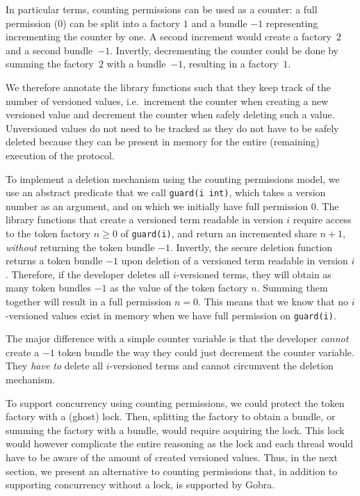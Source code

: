 In particular terms, counting permissions can be used as a counter: a full permission (0) can be split into a factory $1$ and a bundle $-1$ representing incrementing the counter by one.
A second increment would create a factory~$2$ and a second bundle~$-1$. Invertly, decrementing the counter could be done by summing the factory~$2$ with a bundle~$-1$, resulting in a factory~$1$.

We therefore annotate the library functions such that they keep track of the number of versioned values, i.e.\ increment the counter when creating a new versioned value and decrement the counter when safely deleting such a value.
Unversioned values do not need to be tracked as they do not have to be safely deleted because they can be present in memory for the entire (remaining) execution of the protocol.

To implement a deletion mechanism using the counting permissions model, we use an abstract predicate that we call \texttt{guard(i int)}, which takes a version number as an argument, and on which we initially have full permission $0$. The library functions that create a versioned term readable in version $i$ require access to the token factory $n\geq0$ of \texttt{guard(i)}, and return an incremented share $n+1$, \emph{without} returning the token bundle $-1$. Invertly, the secure deletion function returns a token bundle $-1$ upon deletion of a versioned term readable in version $i$. Therefore, if the developer deletes all $i$-versioned terms, they will obtain as many token bundles $-1$ as the value of the token factory $n$. Summing them together will result in a full permission $n = 0$. This means that we know that no $i$-versioned values exist in memory when we have full permission on \texttt{guard(i)}.

The major difference with a simple counter variable is that the developer \emph{cannot} create a $-1$ token bundle the way they could just decrement the counter variable. They \emph{have to} delete all $i$-versioned terms and cannot circumvent the deletion mechanism.

To support concurrency using counting permissions, we could protect the token factory with a (ghost) lock.
Then, splitting the factory to obtain a bundle, or summing the factory with a bundle, would require acquiring the lock.
This lock would however complicate the entire reasoning as the lock and each thread would have to be aware of the amount of created versioned values.
Thus, in the next section, we present an alternative to counting permissions that, in addition to supporting concurrency without a lock, is supported by Gobra.

